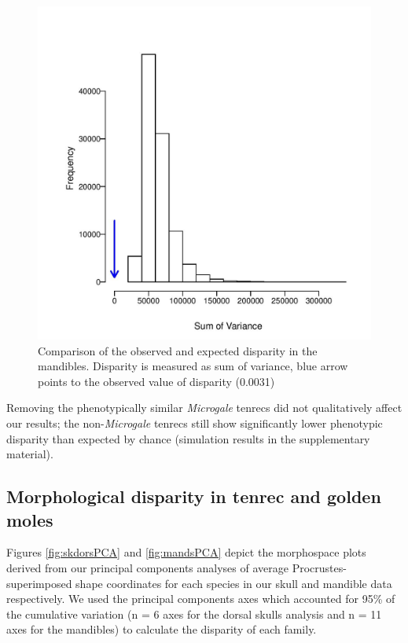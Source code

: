 \documentclass[12pt,a4paper]{article}
\begin{document}
\begin{figure}
\centering
\includegraphics[width=1\linewidth]{figures/mands_trc+gmole_tenrec_sumvariance.jpg}

\caption{Comparison of the observed and expected disparity in the mandibles. Disparity is measured as sum of variance, blue arrow points to the observed value of disparity (0.0031)}
\label{fig:mands_sumvar}
\end{figure}




Removing the phenotypically similar \textit{Microgale} tenrecs did not qualitatively affect our results; the non-\textit{Microgale} tenrecs still show significantly lower phenotypic disparity than expected by chance (simulation results in the supplementary material). 



\subsection{Morphological disparity in tenrec and golden moles} 

Figures  \ref{fig:skdorsPCA} and \ref{fig:mandsPCA} depict the morphospace plots derived from our principal components analyses of average Procrustes-superimposed shape coordinates for each species in our skull and mandible data respectively. We used the principal components axes which accounted for 95\% of the cumulative variation (n = 6 axes for the dorsal skulls analysis and n = 11 axes for the mandibles) to calculate the disparity of each family. 
\end{document}
